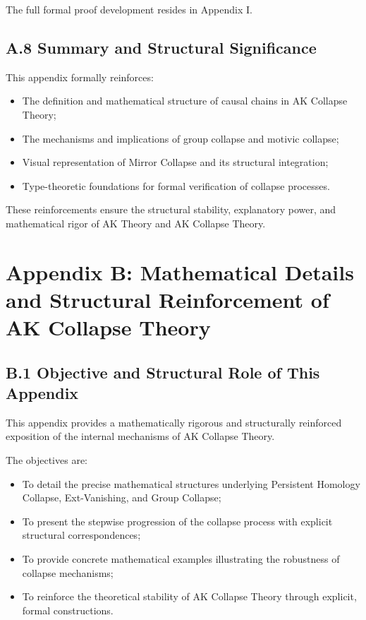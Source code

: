 \documentclass[11pt]{article}
\begin{document}
The full formal proof development resides in Appendix I.

\subsection*{A.8 Summary and Structural Significance}

This appendix formally reinforces:

\begin{itemize}
    \item The definition and mathematical structure of causal chains in AK Collapse Theory;
    \item The mechanisms and implications of group collapse and motivic collapse;
    \item Visual representation of Mirror Collapse and its structural integration;
    \item Type-theoretic foundations for formal verification of collapse processes.
\end{itemize}

These reinforcements ensure the structural stability, explanatory power, and mathematical rigor of AK Theory and AK Collapse Theory.

\FloatBarrier




\section*{Appendix B: Mathematical Details and Structural Reinforcement of AK Collapse Theory}

\subsection*{B.1 Objective and Structural Role of This Appendix}

This appendix provides a mathematically rigorous and structurally reinforced exposition of the internal mechanisms of AK Collapse Theory.

The objectives are:

\begin{itemize}
    \item To detail the precise mathematical structures underlying Persistent Homology Collapse, Ext-Vanishing, and Group Collapse;
    \item To present the stepwise progression of the collapse process with explicit structural correspondences;
    \item To provide concrete mathematical examples illustrating the robustness of collapse mechanisms;
    \item To reinforce the theoretical stability of AK Collapse Theory through explicit, formal constructions.
\end{itemize}
\end{document}
